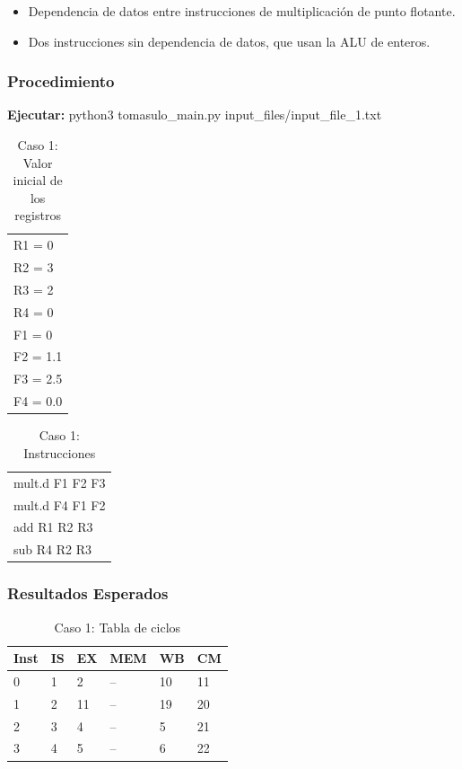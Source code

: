 \documentclass[a4paper]{article}
\begin{document}
	\begin{itemize}
		\item Dependencia de datos entre instrucciones de multiplicación de punto flotante.
		\item Dos instrucciones sin dependencia de datos, que usan la ALU de enteros. 
	\end{itemize}

	\subsubsection*{Procedimiento}

	\textbf{Ejecutar:} python3 tomasulo\_main.py input\_files/input\_file\_1.txt

	\begin{table}[H]
		\centering
		\caption*{Caso 1: Valor inicial de los registros}
		\begin{tabular}{l}
		R1 = 0 \\
		R2 = 3 \\
		R3 = 2 \\
		R4 = 0 \\
		F1 = 0 \\
		F2 = 1.1 \\
		F3 = 2.5 \\
		F4 = 0.0
		\end{tabular}
	\end{table}

	\begin{table}[H]
		\centering
		\caption*{Caso 1: Instrucciones}
		\begin{tabular}{l}
		mult.d F1 F2 F3 \\
		mult.d F4 F1 F2 \\
		add R1 R2 R3 \\
		sub R4 R2 R3
		\end{tabular}
	\end{table}
	
	\subsubsection*{Resultados Esperados}

	\begin{table}[H]
		\centering
		\caption*{Caso 1: Tabla de ciclos}
		\begin{tabular}{|l|l|l|l|l|l|}
		\hline
		\textbf{Inst} & \textbf{IS} & \textbf{EX} & \textbf{MEM} & \textbf{WB} & \textbf{CM} \\ \hline
		0             & 1           & 2           & --           & 10          & 11          \\ \hline
		1             & 2           & 11          & --           & 19          & 20          \\ \hline
		2             & 3           & 4           & --           & 5           & 21          \\ \hline
		3             & 4           & 5           & --           & 6           & 22          \\ \hline
		\end{tabular}
	\end{table}
\end{document}
